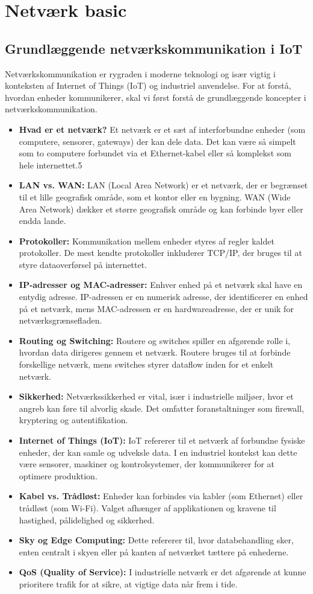 \part{Netværk basic}
\chapter{Grundlæggende netværkskommunikation i IoT}
Netværkskommunikation er rygraden i moderne teknologi og især vigtig i konteksten af Internet of Things (IoT) og industriel anvendelse. For at forstå, hvordan enheder kommunikerer, skal vi først forstå de grundlæggende koncepter i netværkskommunikation.
\begin{itemize}
	\item \textbf{Hvad er et netværk?} Et netværk er et sæt af interforbundne enheder (som computere, sensorer, gateways) der kan dele data. Det kan være så simpelt som to computere forbundet via et Ethernet-kabel eller så komplekst som hele internettet.5
	\item \textbf{LAN vs. WAN:} LAN (Local Area Network) er et netværk, der er begrænset til et lille geografisk område, som et kontor eller en bygning. WAN (Wide Area Network) dækker et større geografisk område og kan forbinde byer eller endda lande.
	\item \textbf{Protokoller:} Kommunikation mellem enheder styres af regler kaldet protokoller. De mest kendte protokoller inkluderer TCP/IP, der bruges til at styre dataoverførsel på internettet.
	\item \textbf{IP-adresser og MAC-adresser:} Enhver enhed på et netværk skal have en entydig adresse. IP-adressen er en numerisk adresse, der identificerer en enhed på et netværk, mens MAC-adressen er en hardwareadresse, der er unik for netværksgrænsefladen.
	\item \textbf{Routing og Switching:} Routere og switches spiller en afgørende rolle i, hvordan data dirigeres gennem et netværk. Routere bruges til at forbinde forskellige netværk, mens switches styrer dataflow inden for et enkelt netværk.
	\item \textbf{Sikkerhed:} Netværkssikkerhed er vital, især i industrielle miljøer, hvor et angreb kan føre til alvorlig skade. Det omfatter foranstaltninger som firewall, kryptering og autentifikation.
	\item \textbf{Internet of Things (IoT):} IoT refererer til et netværk af forbundne fysiske enheder, der kan samle og udveksle data. I en industriel kontekst kan dette være sensorer, maskiner og kontrolsystemer, der kommunikerer for at optimere produktion.
	\item \textbf{Kabel vs. Trådløst:} Enheder kan forbindes via kabler (som Ethernet) eller trådløst (som Wi-Fi). Valget afhænger af applikationen og kravene til hastighed, pålidelighed og sikkerhed.
	\item \textbf{Sky og Edge Computing:} Dette refererer til, hvor databehandling sker, enten centralt i skyen eller på kanten af netværket tættere på enhederne.
	\item \textbf{QoS (Quality of Service):} I industrielle netværk er det afgørende at kunne prioritere trafik for at sikre, at vigtige data når frem i tide.
\end{itemize}
